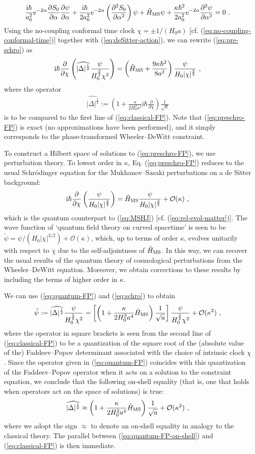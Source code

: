 \documentclass[12pt]{iopart}
\def\eq#1{\begin{equation}\begin{aligned}#1\end{aligned}\end{equation}}
\def\eref#1{(\ref{eq:#1})}
\def\e{\mathrm{e}}
\def\I{\mathrm{i}}
\def\del#1#2{\frac{\partial#1}{\partial#2}}
\def\Ob{\mathcal{O}}
\begin{document}
\eq{\label{eq:pre-schro}
\frac{\I\hbar}{a_0^2}\e^{-2\alpha}\del{S_0}{\alpha}\del{\psi}{\alpha}+\frac{\I\hbar}{2a_0^2}\e^{-2\alpha}\left(\del{^2 S_0}{\alpha^2}\right)\psi+\hat{H}_{\rm MS}\psi+\frac{\kappa\hbar^2}{2a_0^2}\e^{-2\alpha}\del{^2\psi}{\alpha^2} = 0 \ .
}
Using the no-coupling conformal time clock $\chi = \pm 1/(H_0a)$ [cf. \eref{no-coupling-conformal-time}] together with \eref{deSitter-action}, we can rewrite \eref{pre-schro} as \citep{Chataignier:2020fap,Chataignier:2022iwb,Chataig:Thesis}
\eq{\label{eq:preschro-FP}
\I\hbar\del{}{\chi}\left(\widehat{|\Delta|^{\frac12}}\frac{\psi}{H_0^{\frac32}\chi^2}\right) = \left(\hat{H}_{\rm MS}+\frac{9\kappa\hbar^2}{8a^2}\right)\frac{\psi}{H_0|\chi|^\frac{3}{2}} \ ,
}
where the operator
\eq{\label{eq:quantum-FP}
\widehat{|\Delta|^{\frac12}} := \left(1+\frac{\kappa}{2H_0^2 a^4}\I\hbar\del{}{\chi}\right)\frac{1}{\sqrt{a}}
}
is to be compared to the first line of \eref{classical-FP}. Note that \eref{preschro-FP} is exact (no approximations have been performed), and it simply corresponds to the phase-transformed Wheeler--DeWitt constraint.

To construct a Hilbert space of solutions to \eref{preschro-FP}, we use perturbation theory. To lowest order in $\kappa$, Eq. \eref{preschro-FP} reduces to the usual Schr\"odinger equation for the Mukhanov--Sasaki perturbations on a de Sitter background:
\eq{\label{eq:schro}
\I\hbar\del{}{\chi}\left(\frac{\psi}{H_0|\chi|^\frac32}\right) = \hat{H}_{\rm MS}\frac{\psi}{H_0|\chi|^\frac{3}{2}} +\Ob(\kappa)\ ,
}
which is the quantum counterpart to \eref{MSHJ} [cf. \eref{rel-evol-matter}]. The wave function of `quantum field theory on curved spacetime' is seen to be $\tilde{\psi} = \psi/(H_0|\chi|^{3/2})+\Ob(\kappa)$, which, up to terms of order $\kappa$, evolves unitarily with respect to $\chi$ due to the self-adjointness of $\hat{H}_{\rm MS}$. In this way, we can recover the usual results of the quantum theory of cosmological perturbations from the Wheeler--DeWitt equation. Moreover, we obtain corrections to these results by including the terms of higher order in $\kappa$.

We can use \eref{quantum-FP} and \eref{schro} to obtain
\eq{\label{eq:tilde-psi}
\tilde{\psi}:=\widehat{|\Delta|^{\frac12}}\frac{\psi}{H_0^{\frac32}\chi^2} = \left[\left(1+\frac{\kappa}{2H_0^2 a^4}\hat{H}_{\rm MS}\right)\frac{1}{\sqrt{a}}\right]\frac{\psi}{H_0^{\frac32}\chi^2}+\Ob(\kappa^2) \ , 
}
where the operator in square brackets is seen from the second line of \eref{classical-FP} to be a quantization of the square root of the (absolute value of the) Faddeev--Popov determinant associated with the choice of intrinsic clock $\chi$. Since the operator given in \eref{quantum-FP} coincides with this quantization of the Faddeev--Popov operator when it acts on a solution to the constraint equation, we conclude that the following on-shell equality (that is, one that holds when operators act on the space of solutions) is true:
\eq{\label{eq:quantum-FP-on-shell}
\widehat{|\Delta|^{\frac12}}\approx\left(1+\frac{\kappa}{2H_0^2 a^4}\hat{H}_{\rm MS}\right)\frac{1}{\sqrt{a}}+\Ob(\kappa^2) \ ,
}
where we adopt the sign $\approx$ to denote an on-shell equality in analogy to the classical theory. The parallel between \eref{quantum-FP-on-shell} and \eref{classical-FP} is then immediate.
\end{document}
